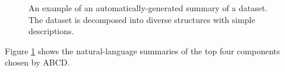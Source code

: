 \documentclass[letterpaper]{article}
\newcommand{\procedurename}{ABCD}
\begin{document}
\begin{figure}[h]
\centering
{}
\caption{
An example of an automatically-generated summary of a dataset.  The dataset is decomposed into diverse structures with simple descriptions.}
\label{fig:exec}
\end{figure}
Figure \ref{fig:exec} shows the natural-language summaries of the top four components chosen by \procedurename{}.
%
%
\end{document}
